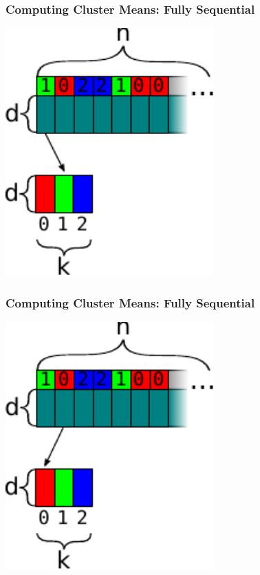 \documentclass[rgb,dvipsnames]{beamer}
\begin{document}
\begin{frame}[fragile]
  \frametitle{Computing Cluster Means: Fully Sequential}

  \begin{center}
\includegraphics[width=0.6\textwidth]{img/cluster_means_seq_0.pdf}
\end{center}
\end{frame}

\begin{frame}[fragile]
  \frametitle{Computing Cluster Means: Fully Sequential}

  \begin{center}
\includegraphics[width=0.6\textwidth]{img/cluster_means_seq_1.pdf}
\end{center}
\end{frame}
\end{document}
